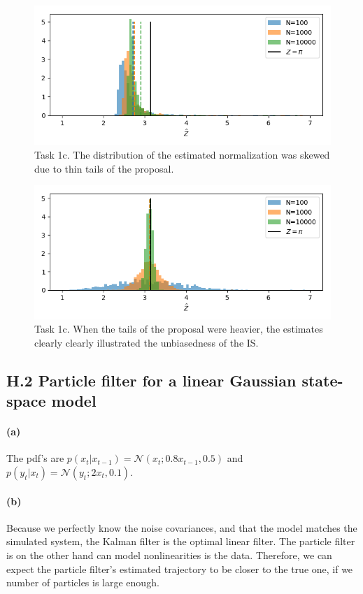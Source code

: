 \documentclass{article}
\begin{document}
\begin{figure}[h]
	\centering
	\includegraphics[width=.7\linewidth]{1_c_hist1}
	\caption{Task 1c. The distribution of the estimated normalization was skewed due to thin tails of the proposal.}
	\label{fig:1chist1}
\end{figure}
\begin{figure}[h]
	\centering
	\includegraphics[width=.7\linewidth]{1_c_hist2}
	\caption{Task 1c. When the tails of the proposal were heavier, the estimates clearly clearly illustrated the unbiasedness of the IS.}
	\label{fig:1chist2}
\end{figure}





\subsection*{H.2 Particle filter for a linear Gaussian state-space model}
\paragraph{(a)} The pdf's are $p(x_t|x_{t-1}) = \mathcal{N}(x_t; 0.8x_{t-1}, 0.5)$ and $ p(y_t|x_t) = \mathcal{N}(y_t;2x_t, 0.1) $.

\paragraph{(b)} Because we perfectly know the noise covariances, and that the model matches the simulated system, the Kalman filter is the optimal linear filter. The particle filter is on the other hand can model nonlinearities is the data. Therefore, we can expect the particle filter's estimated trajectory to be closer to the true one, if we number of particles is large enough.
\end{document}
